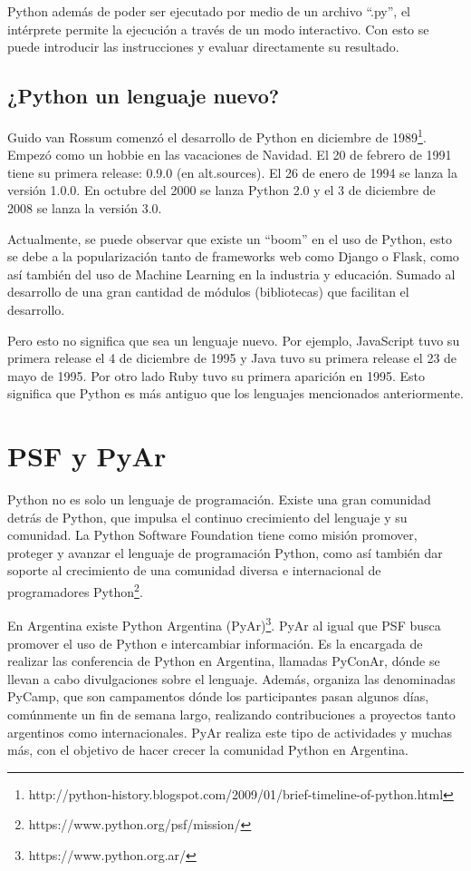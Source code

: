 \documentclass[12pt,a4paper,titlepage]{article}
\begin{document}
Python además de poder ser ejecutado por medio de un archivo ``.py'', el
intérprete permite la ejecución a través de un modo interactivo. Con esto se puede
introducir las instrucciones y evaluar directamente su resultado. 

\subsection{¿Python un lenguaje nuevo?}
Guido van Rossum comenzó el desarrollo de Python en diciembre de
1989\footnote{http://python-history.blogspot.com/2009/01/brief-timeline-of-python.html}.
Empezó como un hobbie en las vacaciones de Navidad. El 20 de febrero de 1991 tiene su
primera release: 0.9.0 (en alt.sources). El 26 de enero de 1994 se lanza la versión 1.0.0.
En octubre del 2000 se lanza Python 2.0 y el 3 de diciembre de 2008 se lanza la versión
3.0.

Actualmente, se puede observar que existe un ``boom'' en el uso de Python, esto se debe
a la popularización tanto de frameworks web como Django o Flask, como así
también del uso de Machine Learning en la industria y educación. Sumado al
desarrollo de una gran cantidad de módulos (bibliotecas) que facilitan el desarrollo.

Pero esto no significa que sea un lenguaje nuevo. Por ejemplo, JavaScript tuvo su primera
release el 4 de diciembre de 1995 y Java tuvo su primera release el 23 de mayo de 1995.
Por otro lado Ruby tuvo su primera aparición en 1995. Esto significa que Python es más 
antiguo que los lenguajes mencionados anteriormente.

\section{PSF y PyAr}
Python no es solo un lenguaje de programación. Existe una gran comunidad detrás de Python,
que impulsa el continuo crecimiento del lenguaje y su comunidad. La Python Software
Foundation tiene como misión promover, proteger y avanzar el lenguaje de programación Python, 
como así también dar soporte al crecimiento de una comunidad diversa e internacional de 
programadores Python\footnote{https://www.python.org/psf/mission/}.

En Argentina existe Python Argentina (PyAr)\footnote{https://www.python.org.ar/}. PyAr al
igual que PSF busca promover el uso de Python e intercambiar información. Es la encargada
de realizar las conferencia de Python en Argentina, llamadas PyConAr, dónde se llevan a cabo
divulgaciones sobre el lenguaje. Además, organiza las denominadas PyCamp, que son campamentos
dónde los participantes pasan algunos días, comúnmente un fin de semana largo, realizando
contribuciones a proyectos tanto argentinos como internacionales. PyAr realiza este tipo
de actividades y muchas más, con el objetivo de hacer crecer la comunidad Python en Argentina.
\end{document}
